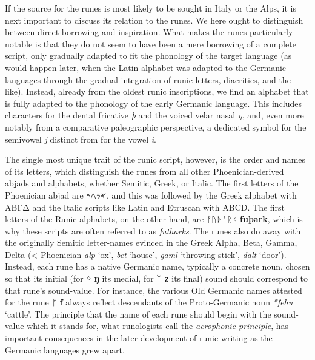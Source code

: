If the source for the runes is most likely to be sought in Italy or the Alps, it is next important to discuss its relation to the runes.  We here ought to distinguish between direct borrowing and inspiration.  What makes the runes particularly notable is that they do not seem to have been a mere borrowing of a complete script, only gradually adapted to fit the phonology of the target language (as would happen later, when the Latin alphabet was adapted to the Germanic languages through the gradual integration of runic letters, diacritics, and the like).  Instead, already from the oldest runic inscriptions, we find an alphabet that is fully adapted to the phonology of the early Germanic language.  This includes characters for the dental fricative \emph{þ} and the voiced velar nasal \emph{ŋ}, and, even more notably from a comparative paleographic perspective, a dedicated symbol for the semivowel \emph{j} distinct from for the vowel \emph{i}.

The single most unique trait of the runic script, however, is the order and names of its letters, which distinguish the runes from all other Phoenician-derived abjads and alphabets, whether Semitic, Greek, or Italic.  The first letters of the Phoenician abjad are \texthebrew{𐤀𐤁𐤂𐤃}, and this was followed by the Greek alphabet with \textgreek{ΑΒΓΔ} and the Italic scripts like Latin and Etruscan with ABCD.  The first letters of the Runic alphabets, on the other hand, are ᚠᚢᚦᚨᚱᚲ \textbf{fuþark}, which is why these scripts are often referred to as \emph{futharks}.  The runes also do away with the originally Semitic letter-names evinced in the Greek Alpha, Beta, Gamma, Delta (< Phoenician \emph{alp} ‘ox’, \emph{bet} ‘house’, \emph{gaml} ‘throwing stick’, \emph{dalt} ‘door’).  Instead, each rune has a native Germanic name, typically a concrete noun, chosen so that its initial (for ᛜ \textbf{ŋ} its medial, for ᛉ \textbf{z} its final) sound should correspond to that rune’s sound-value.  For instance, the various Old Germanic names attested for the rune ᚠ \textbf{f} always reflect descendants of the Proto-Germanic noun \emph{*fehu} ‘cattle’.  The principle that the name of each rune should begin with the sound-value which it stands for, what runologists call the \emph{acrophonic principle}, has important consequences in the later development of runic writing as the Germanic languages grew apart.

